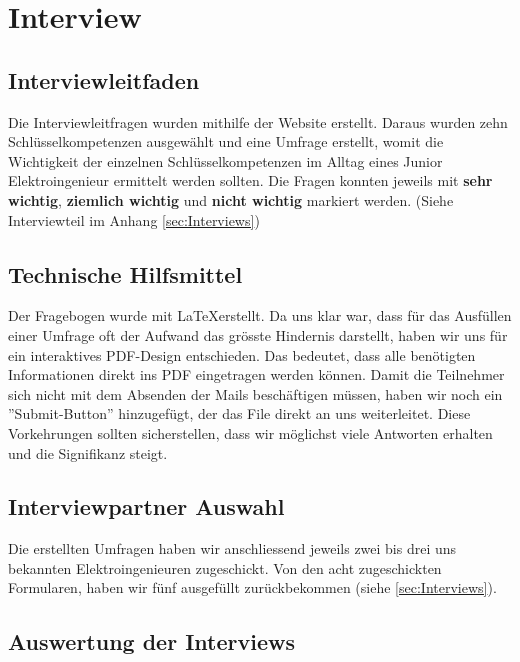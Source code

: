
\chapter{Interview}


\section{Interviewleitfaden}

Die Interviewleitfragen wurden mithilfe der Website \cite{Schluesselqualifikationen} erstellt. Daraus wurden zehn Schlüsselkompetenzen ausgewählt und eine Umfrage erstellt, womit die Wichtigkeit der einzelnen Schlüsselkompetenzen im Alltag eines Junior Elektroingenieur ermittelt werden sollten. Die Fragen konnten jeweils mit \textbf{sehr wichtig}, \textbf{ziemlich wichtig} und \textbf{nicht wichtig} markiert werden. (Siehe Interviewteil im Anhang \ref{sec:Interviews}) 

\section {Technische Hilfsmittel}

Der Fragebogen wurde mit \LaTeX erstellt. Da uns klar war, dass für das Ausfüllen einer Umfrage oft der Aufwand das grösste Hindernis darstellt, haben wir uns für ein interaktives PDF-Design entschieden. Das bedeutet, dass alle benötigten Informationen direkt ins PDF eingetragen werden können. Damit die Teilnehmer sich nicht mit dem Absenden der Mails beschäftigen müssen, haben wir noch ein ''Submit-Button'' hinzugefügt, der das File direkt an uns weiterleitet. Diese Vorkehrungen sollten sicherstellen, dass wir möglichst viele Antworten erhalten und die Signifikanz steigt. 


\section{Interviewpartner Auswahl}

Die erstellten Umfragen haben wir anschliessend jeweils zwei bis drei uns bekannten Elektroingenieuren zugeschickt. Von den acht zugeschickten Formularen, haben wir fünf ausgefüllt zurückbekommen (siehe \ref{sec:Interviews}). 

\section{Auswertung der Interviews}

